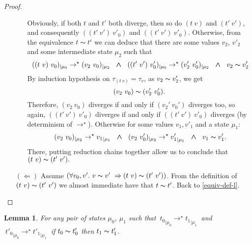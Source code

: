 \documentclass[a4paper,11pt,oneside]{article}
\theoremstyle{plain}
\newtheorem{lemma}[definition]{Lemma}
\newcommand{\tmapp}[2]{(#1 ~ #2)}
\newcommand{\ty}[1][]{\tau_{#1}}
\newcommand{\bwedge}{\boldsymbol{~\wedge~}}
\newcommand{\evalstar}[4]{~#1_{|\mu_#2} \rightarrow^{\star} #3_{|\mu_#4} ~}
\newcommand{\eqv}[1]{#1 \thicksim #1'}
\begin{document}
\begin{proof}
\begin{itemize}
\begin{itemize}
		Obviously, if both $t$ and $t'$ both diverge,
		then so do $\tmapp{t}{v}$ and $\tmapp{t'}{v'}$, and consequently 
		$\tmapp{\tmapp{t'}{v'}}{v'_0}$ and $\tmapp{\tmapp{t'}{v'}}{v'_0}$.
		Otherwise, from the equivalence $\eqv{t}$ we can deduce that there are
		some values $v_2$, $v'_2$ and some intermediate state $\mu_2$ such that
		$$\evalstar{\tmapp{\tmapp{t}{v}}{v_0}}{0}{\tmapp{v_2}{v_0}}{2} \bwedge
		\evalstar{\tmapp{\tmapp{t'}{v'}}{v'_0}}{0}{\tmapp{v'_2}{v'_0}}{2} 
		\bwedge~\eqv{v_2}$$	
		By induction hypothesis on $\ty[\tmapp{t}{v}]=\ty[v]$, as $\eqv{v_2}$, we 
		get	$$ \tmapp{v_2}{v_0} \thicksim \tmapp{v'_2}{v'_0}.$$ Therefore, 
		$\tmapp{v_2}{v_0}$ diverges if and only if $\tmapp{v_2'}{v_0'}$ diverges 
		too, so again, $\tmapp{\tmapp{t'}{v'}}{v'_0}$ diverges if and only if 
		$\tmapp{\tmapp{t'}{v'}}{v'_0}$ diverges (by determinism of 
		$\rightarrow^\star$). Otherwise for some values $v_1, v'_1$ and a state
		$\mu_1$:
		$$\evalstar{\tmapp{v_2}{v_0}}{2}{{v_1}}{1} \bwedge
		\evalstar{\tmapp{v_2}{v'_0}}{2}{{v'_1}}{1} 
		\bwedge~\eqv{v_1}.$$ There, putting reduction chains together allow us to 
		conclude that $\tmapp{t}{v} \thicksim \tmapp{t'}{v'}.$ 
		\end{itemize}
		
	
		\item[$(\Leftarrow)$] Assume $(\forall v_0, v'.~\eqv{v}~\Rightarrow
		\tmapp{t}{v} \thicksim \tmapp{t'}{v'})$. From the definition of 
		\mbox{$\tmapp{t}{v}\thicksim\tmapp{t'}{v'}$} we almost immediate have 
		that $\eqv{t}$. Back to \ref{equiv-def-l}.
				
		\end{itemize}	
	\end{proof}

	\begin{lemma}
		For any pair of states $\mu_0$, $\mu_1$ such that
		$\evalstar{{t_0}}{0}{{t_1}}{1}$ and $\evalstar{{t'_0}}{0}{{t'_1}}{1}$
		if $\eqv{t_0}$ then $\eqv{t_1}$.
		\label{equiv-red2-p}
	\end{lemma}
	
\end{document}

